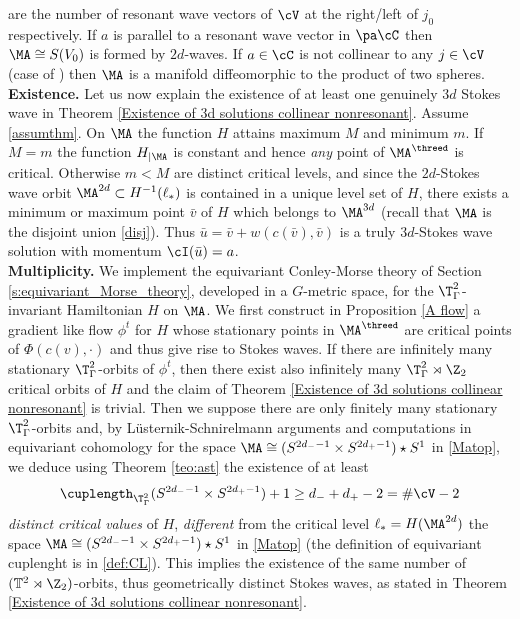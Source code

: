 \documentclass[11pt,a4paper,reqno]{article}
\numberwithin{equation}{section}
\theoremstyle{definition}
\begin{document}
are the number of resonant wave vectors of $ \cV $ 
 at the right/left of $ j_0 $ respectively. If $ a $
 is parallel to a resonant wave vector in  
 $  \pa \cC $  
 then $ \MA \cong S(V_0) $ is formed by $ 2d$-waves. If $ a \in \cC $ is not collinear to any $ j \in \cV $ (case of  \cite{CN}) then $ \MA $ is a manifold diffeomorphic to the product of two spheres.
 \\[1mm]
{\bf Existence.}
Let us now explain the 
existence of at least one genuinely $3d$  Stokes wave  in Theorem \ref{Existence of 3d solutions collinear nonresonant}. Assume \eqref{assumthm}.
On  $ \MA $ the function $ H $ attains maximum $ M $ and minimum $m $.
If $ M = m $  the function  $ H_{|\MA} $ is constant and hence {\it any}  point of $ \MA^{\threed}$ is critical. Otherwise $ m < M $ 
    are 
distinct critical levels,  
and since the $2d$-Stokes wave orbit  
$ \MA^{2d} \subset  H^{-1}(\ell_*) $ is contained in a 
unique level set of 
 $ H $, there exists a  minimum 
 or  maximum point $ \bar v $ of  $ H $ which belongs to $ \MA^{3d} $ (recall that $ \MA $ is the disjoint union \eqref{disj}).
Thus  
$ \bar u = \bar v + w(c(\bar v), \bar v)$  is a truly $3d$-Stokes wave  
solution  with momentum  $ \cI(\bar u) =  a $.  
 \\[1mm]
{\bf   Multiplicity.}  
We implement the 
equivariant  Conley-Morse theory
of Section \ref{s:equivariant_Morse_theory},   developed in a $G$-metric space,
for the $ \T^2_\Gamma  $-invariant  Hamiltonian $ H $ on $ \MA $.  
We  first  construct in Proposition 
\ref{A flow}
a gradient like flow $ \phi^t $ for $ H $ whose 
stationary points in $  \MA^{\threed} 
$ 
are  critical points of 
$ \Phi(c(v), \cdot) $ and  thus  give rise to Stokes waves. If there are infinitely many stationary 
    $ \T^2_\Gamma $-orbits of $ \phi^t $, then there exist also infinitely many
    $ \T^2_\Gamma \rtimes \Z_2 $
    critical orbits of $ H $ and the claim of Theorem \ref{Existence of 3d solutions collinear nonresonant} is trivial.
    Then we suppose there are only finitely many stationary 
    $ \T^2_\Gamma $-orbits and,  
by L\"usternik-Schnirelmann arguments and computations in equivariant cohomology for the space $ \MA \cong (S^{2d_- -1} \times 
S^{2d_+-1})\star S^{1}$ in \eqref{Matop},
we deduce using Theorem \ref{teo:ast}
the existence  
of at 
least  
$$ 
\cuplength_{\T^2_\Gamma}(S^{2d_- -1} \times 
S^{2d_+-1})+1  
\geq  d_- + d_+ - 2  =\#\cV- 2 
$$
{\it  distinct  critical values} of $ H $,  
{\it different} from the critical level  
$ \ell_* = H (\MA^{2d}) $  the space $ \MA \cong (S^{2d_- -1} \times 
S^{2d_+-1})\star S^{1}$ in \eqref{Matop} 
(the definition of equivariant cuplenght is in  \eqref{def:CL}). 
This implies the existence of the same number of 
$ (\mathbb{T}^2 \rtimes \Z_2) $-orbits, thus geometrically distinct Stokes waves, as stated in Theorem \ref{Existence of 3d solutions collinear nonresonant}.
\end{document}
